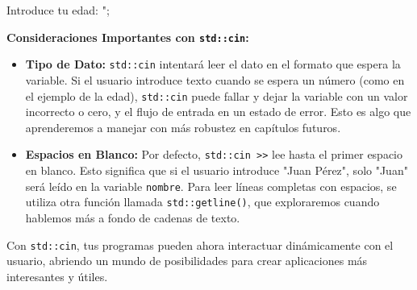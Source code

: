 %
%
%
%
%
%
%
%
%
Introduce tu edad: ";
%
%

\textbf{Consideraciones Importantes con \texttt{std::cin}:}
\begin{itemize}
    \item \textbf{Tipo de Dato:} \texttt{std::cin} intentará leer el dato en el formato que espera la variable. Si el usuario introduce texto cuando se espera un número (como en el ejemplo de la edad), \texttt{std::cin} puede fallar y dejar la variable con un valor incorrecto o cero, y el flujo de entrada en un estado de error. Esto es algo que aprenderemos a manejar con más robustez en capítulos futuros.
    \item \textbf{Espacios en Blanco:} Por defecto, \texttt{std::cin >>} lee hasta el primer espacio en blanco. Esto significa que si el usuario introduce "Juan Pérez", solo "Juan" será leído en la variable \texttt{nombre}. Para leer líneas completas con espacios, se utiliza otra función llamada \texttt{std::getline()}, que exploraremos cuando hablemos más a fondo de cadenas de texto.
\end{itemize}

Con \texttt{std::cin}, tus programas pueden ahora interactuar dinámicamente con el usuario, abriendo un mundo de posibilidades para crear aplicaciones más interesantes y útiles.
